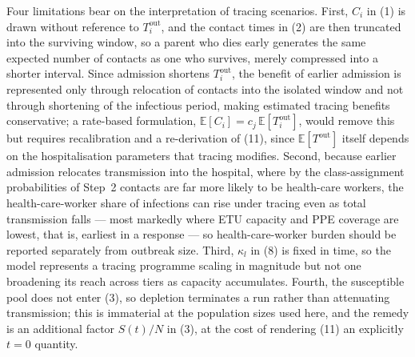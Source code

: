 \documentclass[9pt,letterpaper]{extarticle}
\newcommand{\E}{\mathbb{E}}
\begin{document}
Four limitations bear on the interpretation of tracing scenarios. First, $C_i$ in (1) is drawn without reference to $T_i^{\mathrm{out}}$, and the contact times in (2) are then truncated into the surviving window, so a parent who dies early generates the same expected number of contacts as one who survives, merely compressed into a shorter interval. Since admission shortens $T_i^{\mathrm{out}}$, the benefit of earlier admission is represented only through relocation of contacts into the isolated window and not through shortening of the infectious period, making estimated tracing benefits conservative; a rate-based formulation, $\E[C_i] = c_j\,\E[T_i^{\mathrm{out}}]$, would remove this but requires recalibration and a re-derivation of (11), since $\E[T^{\mathrm{out}}]$ itself depends on the hospitalisation parameters that tracing modifies. Second, because earlier admission relocates transmission into the hospital, where by the class-assignment probabilities of Step~2 contacts are far more likely to be health-care workers, the health-care-worker share of infections can rise under tracing even as total transmission falls --- most markedly where ETU capacity and PPE coverage are lowest, that is, earliest in a response --- so health-care-worker burden should be reported separately from outbreak size. Third, $\kappa_l$ in (8) is fixed in time, so the model represents a tracing programme scaling in magnitude but not one broadening its reach across tiers as capacity accumulates. Fourth, the susceptible pool does not enter (3), so depletion terminates a run rather than attenuating transmission; this is immaterial at the population sizes used here, and the remedy is an additional factor $S(t)/N$ in (3), at the cost of rendering (11) an explicitly $t = 0$ quantity.
\end{document}
